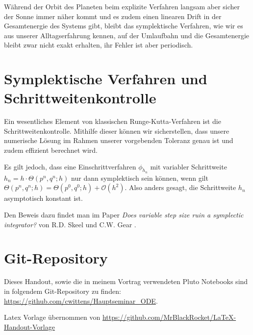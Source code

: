 \documentclass{handout}
\begin{document}
Während der Orbit des Planeten beim explizite Verfahren langsam aber sicher der Sonne immer näher kommt und es zudem einen linearen Drift in der Gesamtenergie des Systems gibt, bleibt das symplektische Verfahren, wie wir es aus unserer Alltagserfahrung kennen, auf der Umlaufbahn und die Gesamtenergie bleibt zwar nicht exakt erhalten, ihr Fehler ist aber periodisch. 

\section{Symplektische Verfahren und Schrittweitenkontrolle}
Ein wesentliches Element von klassischen Runge-Kutta-Verfahren ist die Schrittweitenkontrolle. Mithilfe dieser können wir sicherstellen, dass unsere numerische Lösung im Rahmen unserer vorgebenden Toleranz genau ist und zudem effizient berechnet wird.

Es gilt jedoch, dass eine Einschrittverfahren $\phi_{h_n}$ mit variabler Schrittweite $h_n = h\cdot \Theta(p^n,q^n;h)$ nur dann symplektisch sein können, wenn gilt $\Theta(p^n,q^n;h) = \Theta(p^0,q^0;h) + \mathcal{O}(h^2)$. Also anders gesagt, die Schrittweite $h_n$ asymptotisch konstant ist. 

Den Beweis dazu findet man im Paper \textit{Does variable step size ruin a symplectic integrator?} von R.D. Skeel und C.W. Gear \cite{SKEEL1992311}.



\section*{Git-Repository}
Dieses Handout, sowie die in meinem Vortrag verwendeten Pluto Notebooks sind in folgendem Git-Repository zu finden: \href{https://github.com/cwittens/Hauptseminar_ODE}{https://github.com/cwittens/Hauptseminar\_ODE}.


\makeliteratur
Latex Vorlage übernommen von \href{https://github.com/MrBlackRocket/LaTeX-Handout-Vorlage}{https://github.com/MrBlackRocket/LaTeX-Handout-Vorlage}
\end{document}
